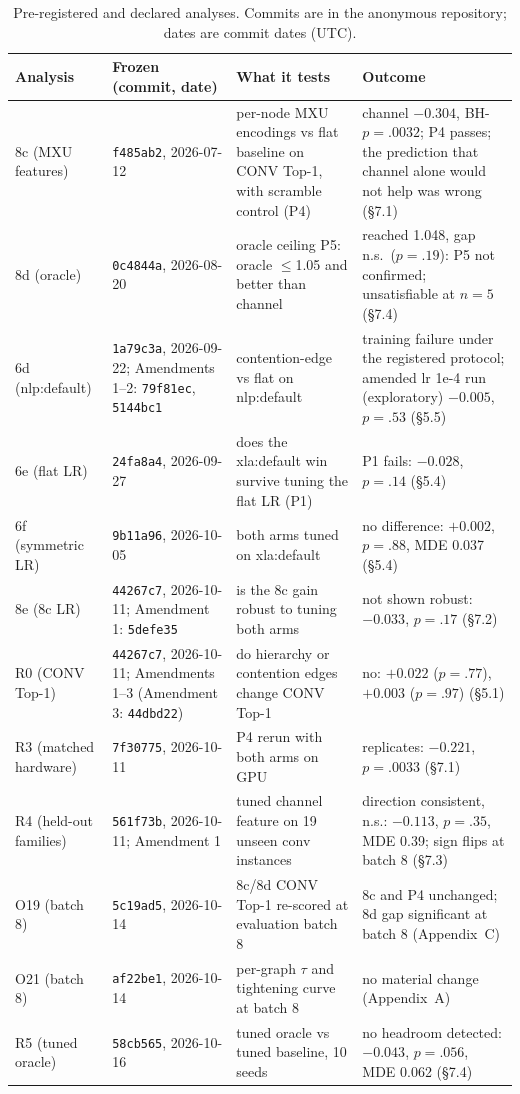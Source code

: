 \documentclass{article}
\begin{document}
\begin{table}[t]
\caption{Pre-registered and declared analyses. Commits are in the anonymous repository; dates are commit
dates (UTC).}
\label{tab:prereg}
\centering
\scriptsize
\begin{tabular}{p{1.6cm}p{1.9cm}p{5.0cm}p{6.6cm}}
\toprule
Analysis & Frozen (commit, date) & What it tests & Outcome \\
\midrule
8c (MXU features) & \texttt{f485ab2}, 2026-07-12 & per-node MXU encodings vs flat baseline on CONV Top-1, with scramble control (P4) & channel $-0.304$, BH-$p = .0032$; P4 passes; the prediction that channel alone would not help was wrong (\S7.1) \\
8d (oracle) & \texttt{0c4844a}, 2026-08-20 & oracle ceiling P5: oracle $\leq$1.05 and better than channel & reached 1.048, gap n.s.\ ($p = .19$): P5 not confirmed; unsatisfiable at $n = 5$ (\S7.4) \\
6d (nlp:default) & \texttt{1a79c3a}, 2026-09-22; Amendments 1--2: \texttt{79f81ec}, \texttt{5144bc1} & contention-edge vs flat on nlp:default & training failure under the registered protocol; amended lr 1e-4 run (exploratory) $-0.005$, $p = .53$ (\S5.5) \\
6e (flat LR) & \texttt{24fa8a4}, 2026-09-27 & does the xla:default win survive tuning the flat LR (P1) & P1 fails: $-0.028$, $p = .14$ (\S5.4) \\
6f (symmetric LR) & \texttt{9b11a96}, 2026-10-05 & both arms tuned on xla:default & no difference: $+0.002$, $p = .88$, MDE 0.037 (\S5.4) \\
8e (8c LR) & \texttt{44267c7}, 2026-10-11; Amendment 1: \texttt{5defe35} & is the 8c gain robust to tuning both arms & not shown robust: $-0.033$, $p = .17$ (\S7.2) \\
R0 (CONV Top-1) & \texttt{44267c7}, 2026-10-11; Amendments 1--3 (Amendment 3: \texttt{44dbd22}) & do hierarchy or contention edges change CONV Top-1 & no: $+0.022$ ($p = .77$), $+0.003$ ($p = .97$) (\S5.1) \\
R3 (matched hardware) & \texttt{7f30775}, 2026-10-11 & P4 rerun with both arms on GPU & replicates: $-0.221$, $p = .0033$ (\S7.1) \\
R4 (held-out families) & \texttt{561f73b}, 2026-10-11; Amendment 1 & tuned channel feature on 19 unseen conv instances & direction consistent, n.s.: $-0.113$, $p = .35$, MDE 0.39; sign flips at batch 8 (\S7.3) \\
O19 (batch 8) & \texttt{5c19ad5}, 2026-10-14 & 8c/8d CONV Top-1 re-scored at evaluation batch 8 & 8c and P4 unchanged; 8d gap significant at batch 8 (Appendix~C) \\
O21 (batch 8) & \texttt{af22be1}, 2026-10-14 & per-graph $\tau$ and tightening curve at batch 8 & no material change (Appendix~A) \\
R5 (tuned oracle) & \texttt{58cb565}, 2026-10-16 & tuned oracle vs tuned baseline, 10 seeds & no headroom detected: $-0.043$, $p = .056$, MDE 0.062 (\S7.4) \\
\bottomrule
\end{tabular}
\end{table}
\end{document}
